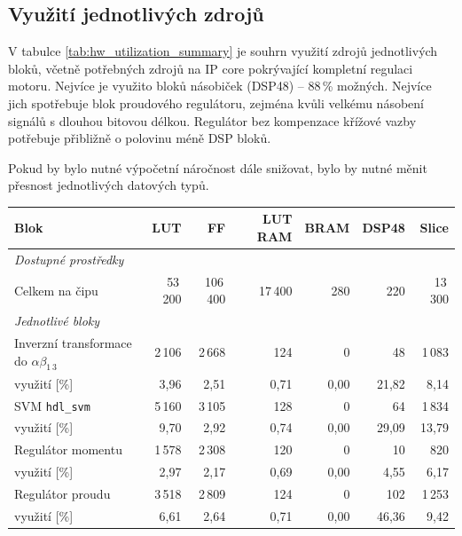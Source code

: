 \subsection{Využití jednotlivých zdrojů}
V tabulce \ref{tab:hw_utilization_summary} je souhrn využití zdrojů jednotlivých bloků, včetně potřebných zdrojů na IP core pokrývající kompletní regulaci motoru. Nejvíce je využito bloků násobiček (DSP48) -- 88\,\% možných. Nejvíce jich spotřebuje blok proudového regulátoru, zejména kvůli velkému násobení signálů s dlouhou bitovou délkou. Regulátor bez kompenzace křížové vazby potřebuje přibližně o polovinu méně DSP bloků.

Pokud by bylo nutné výpočetní náročnost dále snižovat, bylo by nutné měnit přesnost jednotlivých datových typů.


\begin{table}[htbp]
\centering
\small
\setlength{\tabcolsep}{4pt}
\begin{threeparttable}
\begin{tabular}{p{4.5cm}rrrrrr}
    \toprule
    \textbf{Blok}
    & \textbf{LUT}
    & \textbf{FF}
    & \textbf{LUT RAM}
    & \textbf{BRAM}
    & \textbf{DSP48}
    & \textbf{Slice} \\
    \midrule
    \multicolumn{7}{l}{\textit{Dostupné prostředky}} \\
    \quad Celkem na čipu
    & 53\,200 & 106\,400 & 17\,400 & 280
    & 220 & 13\,300 \\
    \midrule
    \multicolumn{7}{l}{\textit{Jednotlivé bloky}} \\
    Inverzní transformace do $\alpha \beta_{1\,3}$ 
    & 2\,106 & 2\,668 & 124 & 0 & 48 & 1\,083 \\
    \quad využití [\%]
    & 3{,}96 & 2{,}51 & 0{,}71 & 0{,}00 & 21{,}82 & 8{,}14 \\
   \addlinespace
    SVM \texttt{hdl\_svm}
    & 5\,160 & 3\,105 & 128 & 0 & 64 & 1\,834 \\
    \quad využití [\%]
    & 9{,}70 & 2{,}92 & 0{,}74 & 0{,}00 & 29{,}09 & 13{,}79 \\
   \addlinespace
    Regulátor momentu
    & 1\,578 & 2\,308 & 120 & 0 & 10 & 820 \\
    \quad využití [\%]
    & 2{,}97 & 2{,}17 & 0{,}69 & 0{,}00 & 4{,}55 & 6{,}17 \\
    \addlinespace
    Regulátor proudu
    & 3\,518 & 2\,809 & 124 & 0 & 102 & 1\,253 \\
    \quad využití [\%]
    & 6{,}61 & 2{,}64 & 0{,}71 & 0{,}00 & 46{,}36 & 9{,}42 \\

\end{tabular}
\end{threeparttable}
\end{table}
